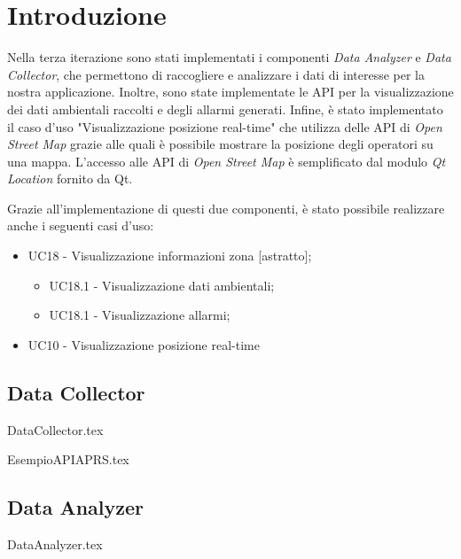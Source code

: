 \section{Introduzione}
Nella terza iterazione sono stati implementati i componenti \textit{Data Analyzer} e \textit{Data Collector}, che permettono di raccogliere e analizzare i dati di interesse per la nostra applicazione. Inoltre, sono state implementate le API per la visualizzazione dei dati ambientali raccolti e degli allarmi generati. Infine, è stato implementato il caso d'uso "Visualizzazione posizione real-time" che utilizza delle API di \textit{Open Street Map} grazie alle quali è possibile mostrare la posizione degli operatori su una mappa. L'accesso alle API di \textit{Open Street Map} è semplificato dal modulo \textit{Qt Location} fornito da Qt. 

Grazie all'implementazione di questi due componenti, è stato possibile realizzare anche i seguenti casi d'uso:
\begin{itemize}
	\item UC18 - Visualizzazione informazioni zona [astratto];
	\begin{itemize}
		\item UC18.1 - Visualizzazione dati ambientali;
		\item UC18.1 - Visualizzazione allarmi;
	\end{itemize}
	\item UC10 - Visualizzazione posizione real-time
\end{itemize}


\subsection{Data Collector}
{DataCollector.tex}

\clearpage

{EsempioAPIAPRS.tex}

\clearpage

\subsection{Data Analyzer}
{DataAnalyzer.tex}

\clearpage

